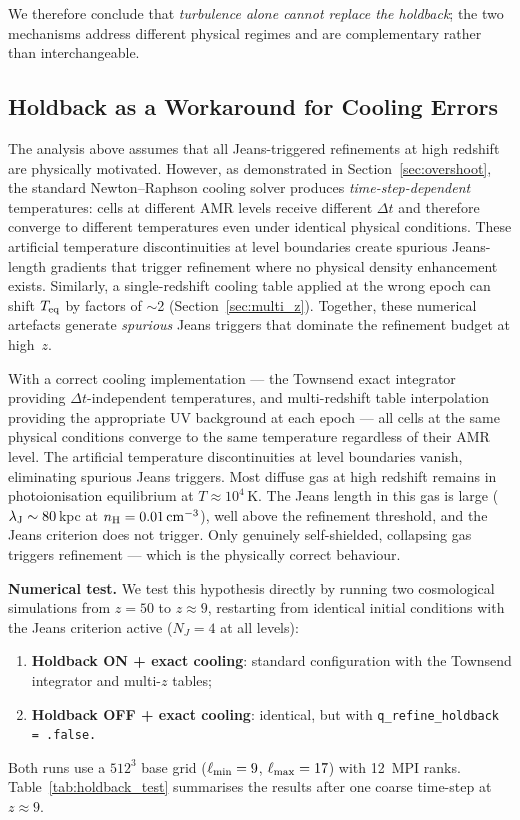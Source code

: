 \documentclass[fleqn,usenatbib]{mnras}
\newcommand{\lJ}{\lambda_{\rm J}}
\newcommand{\code}[1]{\texttt{#1}}
\begin{document}
We therefore conclude that \emph{turbulence alone cannot replace
the holdback}; the two mechanisms address different physical
regimes and are complementary rather than interchangeable.

\subsection{Holdback as a Workaround for Cooling Errors}
\label{sec:holdback_cooling}

The analysis above assumes that all Jeans-triggered refinements at
high redshift are physically motivated.  However, as demonstrated
in Section~\ref{sec:overshoot}, the standard Newton--Raphson
cooling solver produces \emph{time-step-dependent} temperatures:
cells at different AMR levels receive different $\Delta t$ and
therefore converge to different temperatures even under identical
physical conditions.  These artificial temperature discontinuities
at level boundaries create spurious Jeans-length gradients that
trigger refinement where no physical density enhancement exists.
Similarly, a single-redshift cooling table applied at the wrong
epoch can shift $T_{\rm eq}$ by factors of $\sim$2
(Section~\ref{sec:multi_z}).  Together, these numerical artefacts
generate \emph{spurious} Jeans triggers that dominate the
refinement budget at high~$z$.

With a correct cooling implementation --- the Townsend exact
integrator providing $\Delta t$-independent temperatures, and
multi-redshift table interpolation providing the appropriate UV
background at each epoch --- all cells at the same physical
conditions converge to the same temperature regardless of their
AMR level.  The artificial temperature discontinuities at level
boundaries vanish, eliminating spurious Jeans triggers.  Most
diffuse gas at high redshift remains in photoionisation equilibrium
at $T \approx 10^4$\,K.  The Jeans length in this gas is large
($\lJ \sim 80$\,kpc at $n_{\rm H} = 0.01\,{\rm cm}^{-3}$), well
above the refinement threshold, and the Jeans criterion does not
trigger.  Only genuinely self-shielded, collapsing gas triggers
refinement --- which is the physically correct behaviour.

\textbf{Numerical test.}
We test this hypothesis directly by running two cosmological
simulations from $z = 50$ to $z \approx 9$, restarting from
identical initial conditions with the Jeans criterion active
($N_J = 4$ at all levels):
\begin{enumerate}
  \item \textbf{Holdback ON + exact cooling}: standard configuration
    with the Townsend integrator and multi-$z$ tables;
  \item \textbf{Holdback OFF + exact cooling}: identical, but with
    \code{q\_refine\_holdback = .false.}
\end{enumerate}
Both runs use a $512^3$ base grid ($\ell_{\rm min}=9$,
$\ell_{\rm max}=17$) with 12~MPI ranks.
Table~\ref{tab:holdback_test} summarises the results after one
coarse time-step at $z \approx 9$.
\end{document}
